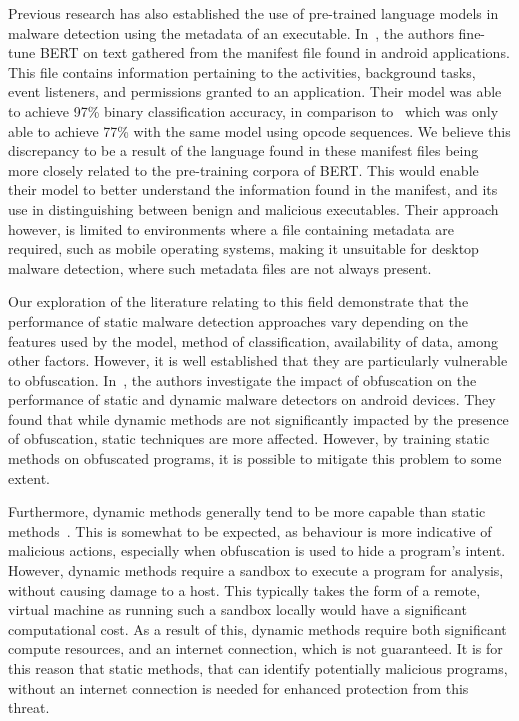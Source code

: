 \documentclass[conference,compsoc]{IEEEtran}
\begin{document}
Previous research has also established the use of pre-trained language models in malware detection using the metadata of an executable. In~\cite{rahaliMalBERTMalwareDetection2021}, the authors fine-tune BERT on text gathered from the manifest file found in android applications. This file contains information pertaining to the activities, background tasks, event listeners, and permissions granted to an application. Their model was able to achieve 97\% binary classification accuracy, in comparison to~\cite{demirciStaticMalwareDetection2022} which was only able to achieve 77\% with the same model using opcode sequences. We believe this discrepancy to be a result of the language found in these manifest files being more closely related to the pre-training corpora of BERT. This would enable their model to better understand the information found in the manifest, and its use in distinguishing between benign and malicious executables. Their approach however, is limited to environments where a file containing metadata are required, such as mobile operating systems, making it unsuitable for desktop malware detection, where such metadata files are not always present. 

Our exploration of the literature relating to this field demonstrate that the performance of static malware detection approaches vary depending on the features used by the model, method of classification, availability of data, among other factors. However, it is well established that they are particularly vulnerable to obfuscation. In~\cite{bacciImpactCodeObfuscation2018}, the authors investigate the impact of obfuscation on the performance of static and dynamic malware detectors on android devices. They found that while dynamic methods are not significantly impacted by the presence of obfuscation, static techniques are more affected. However, by training static methods on obfuscated programs, it is possible to mitigate this problem to some extent. 

Furthermore, dynamic methods generally tend to be more capable than static methods~\cite{damodaranComparisonStaticDynamic2017}. This is somewhat to be expected, as behaviour is more indicative of malicious actions, especially when obfuscation is used to hide a program's intent. However, dynamic methods require a sandbox to execute a program for analysis, without causing damage to a host. This typically takes the form of a remote, virtual machine as running such a sandbox locally would have a significant computational cost. As a result of this, dynamic methods require both significant compute resources, and an internet connection, which is not guaranteed. It is for this reason that static methods, that can identify potentially malicious programs, without an internet connection is needed for enhanced protection from this threat. 
\end{document}
